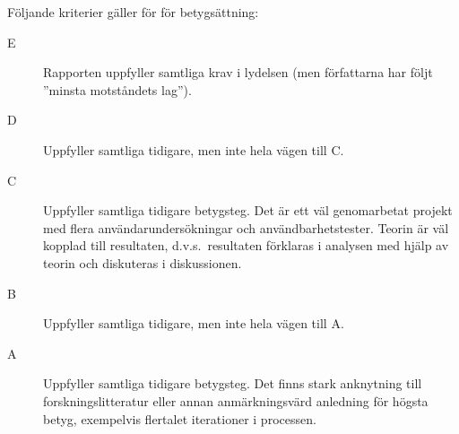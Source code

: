 \documentclass[a4paper,logo,nocourse]{miunasgn}
\begin{document}
Följande kriterier gäller för för betygsättning:
\begin{description}
  \item[E] Rapporten uppfyller samtliga krav i lydelsen (men författarna har 
    följt ''minsta motståndets lag'').


  \item[D] Uppfyller samtliga tidigare, men inte hela vägen till C.

  \item[C] Uppfyller samtliga tidigare betygsteg.
    Det är ett väl genomarbetat projekt med flera användarundersökningar och 
    användbarhetstester.
    Teorin är väl kopplad till resultaten, d.v.s.\ resultaten förklaras 
    i analysen med hjälp av teorin och diskuteras i diskussionen.

  \item[B] Uppfyller samtliga tidigare, men inte hela vägen till A.

  \item[A] Uppfyller samtliga tidigare betygsteg.
    Det finns stark anknytning till forskningslitteratur eller annan 
    anmärkningsvärd anledning för högsta betyg, exempelvis flertalet 
    iterationer i processen.
\end{description}


\printbibliography
\end{document}
